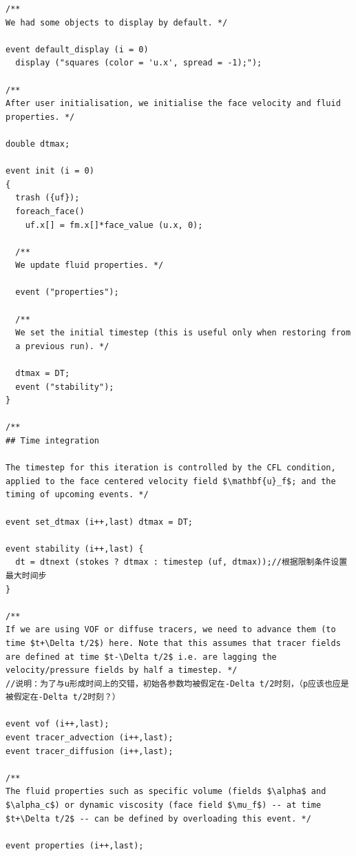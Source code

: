 \documentclass[lang=cn,11pt,a4paper]{elegantpaper}
\begin{document}
\begin{verbatim}
/**
We had some objects to display by default. */

event default_display (i = 0)
  display ("squares (color = 'u.x', spread = -1);");

/**
After user initialisation, we initialise the face velocity and fluid
properties. */

double dtmax;

event init (i = 0)
{
  trash ({uf});
  foreach_face()
    uf.x[] = fm.x[]*face_value (u.x, 0);

  /**
  We update fluid properties. */

  event ("properties");

  /**
  We set the initial timestep (this is useful only when restoring from
  a previous run). */

  dtmax = DT;
  event ("stability");
}

/**
## Time integration

The timestep for this iteration is controlled by the CFL condition,
applied to the face centered velocity field $\mathbf{u}_f$; and the
timing of upcoming events. */

event set_dtmax (i++,last) dtmax = DT;

event stability (i++,last) {
  dt = dtnext (stokes ? dtmax : timestep (uf, dtmax));//根据限制条件设置最大时间步
}

/**
If we are using VOF or diffuse tracers, we need to advance them (to
time $t+\Delta t/2$) here. Note that this assumes that tracer fields
are defined at time $t-\Delta t/2$ i.e. are lagging the
velocity/pressure fields by half a timestep. */
//说明：为了与u形成时间上的交错，初始各参数均被假定在-Delta t/2时刻，（p应该也应是被假定在-Delta t/2时刻？）

event vof (i++,last);
event tracer_advection (i++,last);
event tracer_diffusion (i++,last);

/**
The fluid properties such as specific volume (fields $\alpha$ and
$\alpha_c$) or dynamic viscosity (face field $\mu_f$) -- at time
$t+\Delta t/2$ -- can be defined by overloading this event. */

event properties (i++,last);

\end{verbatim}
\end{document}
